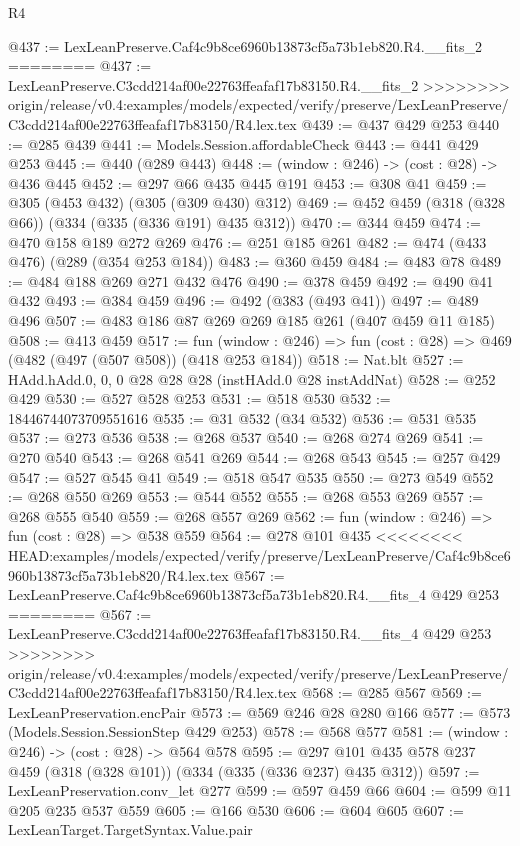 \begin{lexlean}{R4}
\begin{coremodule}
{{{{{{{{{{{{{{@437 := LexLeanPreserve.Caf4c9b8ce6960b13873cf5a73b1eb820.R4.__fits_2
========
@437 := LexLeanPreserve.C3cdd214af00e22763ffeafaf17b83150.R4.__fits_2
>>>>>>>> origin/release/v0.4:examples/models/expected/verify/preserve/LexLeanPreserve/C3cdd214af00e22763ffeafaf17b83150/R4.lex.tex
@439 := @437 @429 @253
@440 := @285 @439
@441 := Models.Session.affordableCheck
@443 := @441 @429 @253
@445 := @440 (@289 @443)
@448 := (window : @246) -> (cost : @28) -> @436 @445
@452 := @297 @66 @435 @445 @191
@453 := @308 @41
@459 := @305 (@453 @432) (@305 (@309 @430) @312)
@469 := @452 @459 (@318 (@328 @66)) (@334 (@335 (@336 @191) @435 @312))
@470 := @344 @459
@474 := @470 @158 @189 @272 @269
@476 := @251 @185 @261
@482 := @474 (@433 @476) (@289 (@354 @253 @184))
@483 := @360 @459
@484 := @483 @78
@489 := @484 @188 @269 @271 @432 @476
@490 := @378 @459
@492 := @490 @41 @432
@493 := @384 @459
@496 := @492 (@383 (@493 @41))
@497 := @489 @496
@507 := @483 @186 @87 @269 @269 @185 @261 (@407 @459 @11 @185)
@508 := @413 @459
@517 := fun (window : @246) => fun (cost : @28) => @469 (@482 (@497 (@507 @508)) (@418 @253 @184))
@518 := Nat.blt
@527 := HAdd.hAdd.{0, 0, 0} @28 @28 @28 (instHAdd.{0} @28 instAddNat)
@528 := @252 @429
@530 := @527 @528 @253
@531 := @518 @530
@532 := 18446744073709551616
@535 := @31 @532 (@34 @532)
@536 := @531 @535
@537 := @273 @536
@538 := @268 @537
@540 := @268 @274 @269
@541 := @270 @540
@543 := @268 @541 @269
@544 := @268 @543
@545 := @257 @429
@547 := @527 @545 @41
@549 := @518 @547 @535
@550 := @273 @549
@552 := @268 @550 @269
@553 := @544 @552
@555 := @268 @553 @269
@557 := @268 @555 @540
@559 := @268 @557 @269
@562 := fun (window : @246) => fun (cost : @28) => @538 @559
@564 := @278 @101 @435
<<<<<<<< HEAD:examples/models/expected/verify/preserve/LexLeanPreserve/Caf4c9b8ce6960b13873cf5a73b1eb820/R4.lex.tex
@567 := LexLeanPreserve.Caf4c9b8ce6960b13873cf5a73b1eb820.R4.__fits_4 @429 @253
========
@567 := LexLeanPreserve.C3cdd214af00e22763ffeafaf17b83150.R4.__fits_4 @429 @253
>>>>>>>> origin/release/v0.4:examples/models/expected/verify/preserve/LexLeanPreserve/C3cdd214af00e22763ffeafaf17b83150/R4.lex.tex
@568 := @285 @567
@569 := LexLeanPreservation.encPair
@573 := @569 @246 @28 @280 @166
@577 := @573 (Models.Session.SessionStep @429 @253)
@578 := @568 @577
@581 := (window : @246) -> (cost : @28) -> @564 @578
@595 := @297 @101 @435 @578 @237 @459 (@318 (@328 @101)) (@334 (@335 (@336 @237) @435 @312))
@597 := LexLeanPreservation.conv_let @277
@599 := @597 @459 @66
@604 := @599 @11 @205 @235 @537 @559
@605 := @166 @530
@606 := @604 @605
@607 := LexLeanTarget.TargetSyntax.Value.pair
}}}}}}}}}}}}}}
\end{coremodule}
\end{lexlean}
